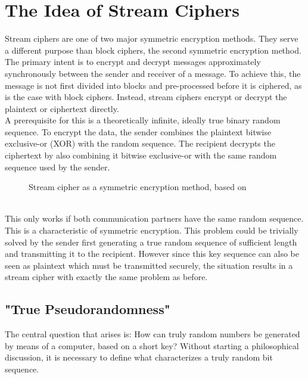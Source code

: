 \section{The Idea of Stream Ciphers}

Stream ciphers are one of two major symmetric encryption methods. They serve a different purpose than block ciphers, the second symmetric encryption method. The primary intent is to encrypt and decrypt messages approximately synchronously between the sender and receiver of a message. To achieve this, the message is not first divided into blocks and pre-processed before it is ciphered, as is the case with block ciphers. Instead, stream ciphers encrypt or decrypt the plaintext or ciphertext directly. \cite[p. 223]{Schneier.2006} \\

A prerequisite for this is a theoretically infinite, ideally true binary random sequence. To encrypt the data, the sender combines the plaintext bitwise exclusive-or (XOR) with the random sequence. The recipient decrypts the ciphertext by also combining it bitwise exclusive-or with the same random sequence used by the sender.
\begin{figure}[h]
	\centering
	
	\caption{Stream cipher as a symmetric encryption method, based on \cite[p. 232]{Schneier.2006}}
	\label{fig:Figure_1}
\end{figure}
\\ This only works if both communication partners have the same random sequence. This is a characteristic of symmetric encryption. \cite[pp. 319-320]{Schmeh.2016} This problem could be trivially solved by the sender first generating a true random sequence of sufficient length and transmitting it to the recipient. However since this key sequence can also be seen as plaintext which must be transmitted securely, the situation results in a stream cipher with exactly the same problem as before.
\subsection{"True Pseudorandomness"}
The central question that arises is: How can truly random numbers be generated by means of a computer, based on a short key? \cite[p. 53]{Beutelspacher.2005} Without starting a philosophical discussion, it is necessary to define what characterizes a truly random bit sequence. \\

